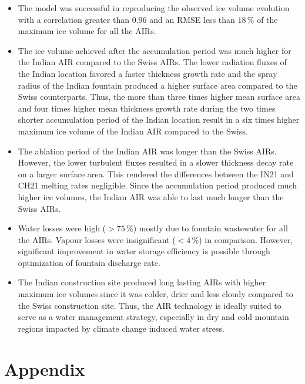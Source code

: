 \documentclass[utf8]{frontiersSCNS}
\begin{document}
\begin{itemize}
	\item The model was successful in reproducing the observed ice volume evolution with a correlation greater
	      than $0.96$ and an RMSE less than $18 \, \%$ of the maximum ice volume for all the AIRs.

	\item The ice volume achieved after the accumulation period was much higher for the Indian AIR compared to the
	      Swiss AIRs. The lower radiation fluxes of the Indian location favored a faster thickness growth rate and the
	      spray radius of the Indian fountain produced a higher surface area compared to the Swiss counterparts. Thus,
	      the more than three times higher mean surface area and four times higher mean thickness growth rate during
	      the two times shorter accumulation period of the Indian location result in a six times higher maximum ice
	      volume of the Indian AIR compared to the Swiss.

	\item The ablation period of the Indian AIR was longer than the Swiss AIRs. However, the lower turbulent fluxes resulted in
	      a slower thickness decay rate on a larger surface area. This rendered the differences between the IN21 and CH21
	      melting rates negligible. Since the accumulation period produced much higher ice volumes, the Indian AIR was
	      able to last much longer than the Swiss AIRs.

	\item Water losses were high ($>75\,\%$) mostly due to fountain wastewater for all the AIRs. Vapour losses were
	      insignificant ($<4\,\%$) in comparison. However, significant improvement in water storage efficiency is possible
	      through optimization of fountain discharge rate.

  \item The Indian construction site produced long lasting AIRs with higher maximum ice volumes since it was
    colder, drier and less cloudy compared to the Swiss construction site. Thus, the AIR technology is ideally
    suited to serve as a water management strategy, especially in dry and cold mountain regions impacted by
    climate change induced water stress.

\end{itemize}

\section{Appendix}
\end{document}
